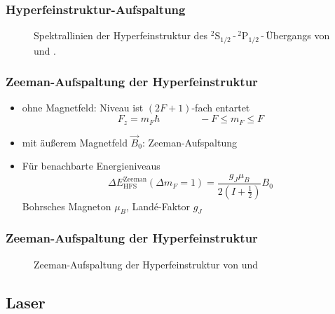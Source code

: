  


\begin{frame}
\frametitle{Hyperfeinstruktur-Aufspaltung}

\begin{figure}
    \centering
    \def\svgwidth{\textwidth}
    
    \caption{Spektrallinien der Hyperfeinstruktur des ${}^2\text{S}_{1/2}$\,-\,${}^2\text{P}_{1/2}$\,-\,Übergangs
    von  und .}
\end{figure}

\end{frame}

\begin{frame}
\frametitle{Zeeman-Aufspaltung der Hyperfeinstruktur}
\begin{itemize}
    \item<1-> ohne Magnetfeld: Niveau ist $(2F+1)$-fach entartet
    \begin{equation*}
        F_z = m_F \hbar \qquad \qquad -F \leq m_F \leq F
    \end{equation*}
    \item<2-> mit äußerem Magnetfeld $\vec{B}_0$: Zeeman-Aufspaltung
    \item<3-> Für benachbarte Energieniveaus
    \begin{equation*}
        \Delta E_\text{HFS}^\text{Zeeman}(\Delta m_F = 1) = \frac{g_J \mu_B}{2 \left( I + \frac{1}{2} \right) } B_0
    \end{equation*}
    Bohrsches Magneton $\mu_B$, Landé-Faktor $g_J$
\end{itemize}
\end{frame}

\begin{frame}
\frametitle{Zeeman-Aufspaltung der Hyperfeinstruktur}


\begin{figure}
    \centering
    \def\svgwidth{\textwidth}
    
    \caption{Zeeman-Aufspaltung der Hyperfeinstruktur von  und }
\end{figure}

\end{frame}





\subsection{Laser}

